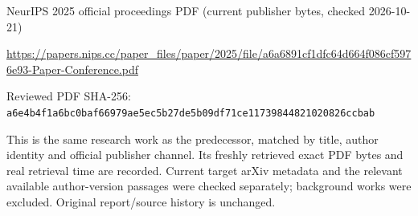 \documentclass[11pt]{article}
\begin{document}
NeurIPS 2025 official proceedings PDF (current publisher bytes, checked 2026-10-21)

\url{https://papers.nips.cc/paper_files/paper/2025/file/a6a6891cf1dfc64d664f086cf5976e93-Paper-Conference.pdf}

Reviewed PDF SHA-256: \nolinkurl{a6e4b4f1a6bc0baf66979ae5ec5b27de5b09df71ce11739844821020826ccbab}

This is the same research work as the predecessor, matched by title, author identity and official publisher channel. Its freshly retrieved exact PDF bytes and real retrieval time are recorded. Current target arXiv metadata and the relevant available author-version passages were checked separately; background works were excluded. Original report/source history is unchanged.
\end{document}
